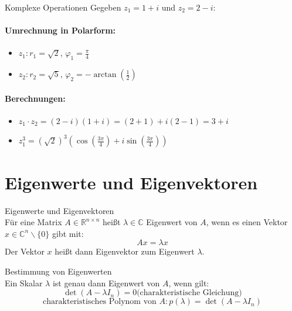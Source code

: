 \begin{example2}{Komplexe Operationen}
Gegeben $z_1 = 1+i$ und $z_2 = 2-i$:

\paragraph{Umrechnung in Polarform:}
\begin{itemize}
    \item $z_1: r_1 = \sqrt{2}$, $\varphi_1 = \frac{\pi}{4}$
    \item $z_2: r_2 = \sqrt{5}$, $\varphi_2 = -\arctan(\frac{1}{2})$
\end{itemize}

\paragraph{Berechnungen:}
\begin{itemize}
    \item $z_1 \cdot z_2 = (2-i)(1+i) = (2+1) + i(2-1) = 3+i$
    \item $z_1^3 = (\sqrt{2})^3(\cos(\frac{3\pi}{4}) + i\sin(\frac{3\pi}{4}))$
\end{itemize}
\end{example2}


\section{Eigenwerte und Eigenvektoren}

\begin{definition}{Eigenwerte und Eigenvektoren}\\
Für eine Matrix $A \in \mathbb{R}^{n\times n}$ heißt $\lambda \in \mathbb{C}$ Eigenwert von $A$, wenn es einen Vektor $x \in \mathbb{C}^n \backslash \{0\}$ gibt mit:
\vspace{-2mm}\\
$$Ax = \lambda x$$
Der Vektor $x$ heißt dann Eigenvektor zum Eigenwert $\lambda$.
\end{definition}

\begin{concept}{Bestimmung von Eigenwerten}\\
Ein Skalar $\lambda$ ist genau dann Eigenwert von $A$, wenn gilt:
\vspace{-2mm}\\
$$\det(A - \lambda I_n) = 0 \text{(charakteristische Gleichung)}$$
$$\text{charakteristisches Polynom von }A : p(\lambda) = \det(A - \lambda I_n)$$
\end{concept}

